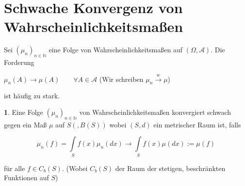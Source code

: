 \documentclass[10pt,a4paper]{report}
\newcommand{\N}{\mathbb{N}}
\numberwithin{equation}{section}
\numberwithin{figure}{section}
\theoremstyle{plain}
\theoremstyle{definition}
\newtheorem{defn}[thm]{\protect\definitionname}
\theoremstyle{remark}
\theoremstyle{plain}
\providecommand{\definitionname}{Definition}
\newcommand{\1}{ \mathbb{1} } %
\begin{document}
\section{Schwache Konvergenz von Wahrscheinlichkeitsmaßen}
Sei $(\mu_n)_{n \in \N}$ eine Folge von Wahrscheinlichkeitsmaßen auf $(\Omega,\mathcal{A})$. Die Forderung
\begin{center}
  $\mu_n(A) \to \mu(A) \qquad \forall A \in \mathcal{A}$ (Wir schreiben $\mu_n \overset{w}{\to} \mu$)
\end{center}
ist häufig zu stark.
\begin{defn}  %
  Eine Folge $(\mu_n)_{n \in \N}$ von Wahrscheinlichkeitsmaßen konvergiert schwach
  gegen ein Maß $\mu$ auf $S(,B(S))$ wobei $(S,d)$ ein metrischer Raum
  ist, falls
  \begin{center}
    \[\mu_n(f)=\int\limits_S f(x)\mu_n(dx) \to
    \int\limits_Sf(x)\mu(dx):=\mu(f)\]
  \end{center}
  für alle $f \in C_b(S)$. (Wobei $C_b(S)$ der Raum der stetigen, beschränkten Funktionen auf $S$)
\end{defn}
\end{document}
